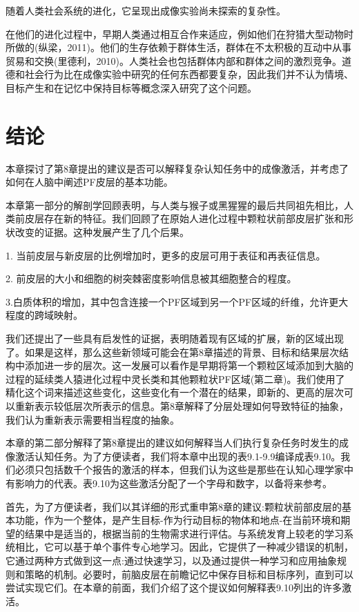 随着人类社会系统的进化，它呈现出成像实验尚未探索的复杂性。

在他们的进化过程中，早期人类通过相互合作来适应，例如他们在狩猎大型动物时所做的(纵梁，2011)。他们的生存依赖于群体生活，群体在不太积极的互动中从事贸易和交换(里德利，2010)。人类社会也包括群体内部和群体之间的激烈竞争。道德和社会行为比在成像实验中研究的任何东西都要复杂，因此我们并不认为情境、目标产生和在记忆中保持目标等概念深入研究了这个问题。

\section{结论}

本章探讨了第8章提出的建议是否可以解释复杂认知任务中的成像激活，并考虑了如何在人脑中阐述PF皮层的基本功能。

本章第一部分的解剖学回顾表明，与人类与猴子或黑猩猩的最后共同祖先相比，人类前皮层存在新的特征。我们回顾了在原始人进化过程中颗粒状前部皮层扩张和形状改变的证据。这种发展产生了几个后果。

1. 当前皮层与新皮层的比例增加时，更多的皮层可用于表征和再表征信息。

2. 前皮层的大小和细胞的树突棘密度影响信息被其细胞整合的程度。

3.白质体积的增加，其中包含连接一个PF区域到另一个PF区域的纤维，允许更大程度的跨域映射。

我们还提出了一些具有启发性的证据，表明随着现有区域的扩展，新的区域出现了。如果是这样，那么这些新领域可能会在第8章描述的背景、目标和结果层次结构中添加进一步的层次。这一发展可以看作是早期将第一个颗粒区域添加到大脑的过程的延续类人猿进化过程中灵长类和其他颗粒状PF区域(第二章)。我们使用了精化这个词来描述这些变化，这些变化有一个潜在的结果，即新的、更高的层次可以重新表示较低层次所表示的信息。第8章解释了分层处理如何导致特征的抽象，我们认为重新表示需要相当程度的抽象。

本章的第二部分解释了第8章提出的建议如何解释当人们执行复杂任务时发生的成像激活认知任务。为了方便读者，我们将本章中出现的表9.1-9.9编译成表9.10。我们必须只包括数千个报告的激活的样本，但我们认为这些是那些在认知心理学家中有影响力的代表。表9.10为这些激活分配了一个字母和数字，以备将来参考。

首先，为了方便读者，我们以其详细的形式重申第8章的建议:颗粒状前部皮层的基本功能，作为一个整体，是产生目标-作为行动目标的物体和地点-在当前环境和期望的结果中是适当的，根据当前的生物需求进行评估。与系统发育上较老的学习系统相比，它可以基于单个事件专心地学习。因此，它提供了一种减少错误的机制，它通过两种方式做到这一点:通过快速学习，以及通过提供一种学习和应用抽象规则和策略的机制。必要时，前脑皮层在前瞻记忆中保存目标和目标序列，直到可以尝试实现它们。在本章的前面，我们介绍了这个提议如何解释表9.10列出的许多激活。

